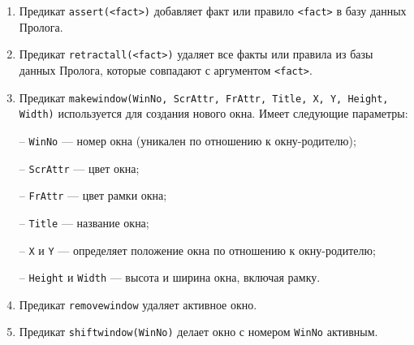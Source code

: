 \begin{enumerate}
\item Предикат \texttt{assert(<fact>)} добавляет факт или правило \texttt{<fact>} в базу данных Пролога.
\item Предикат \texttt{retractall(<fact>)} удаляет все факты или правила из базы данных Пролога, которые совпадают с аргументом \texttt{<fact>}.
\item Предикат \texttt{makewindow(WinNo, ScrAttr, FrAttr, Title, X, Y, Height, Width)}
  используется для создания нового окна. Имеет следующие параметры: \par
    -- \texttt{WinNo} --- номер окна (уникален по отношению к окну-родителю); \par
    -- \texttt{ScrAttr} --- цвет окна; \par
    -- \texttt{FrAttr} --- цвет рамки окна; \par 
    -- \texttt{Title} --- название окна; \par
    -- \texttt{X} и \texttt{Y} --- определяет положение окна по отношению к окну-родителю; \par 
    -- \texttt{Height} и \texttt{Width} --- высота и ширина окна, включая рамку.
\item Предикат \texttt{removewindow} удаляет активное окно.
\item Предикат \texttt{shiftwindow(WinNo)} делает окно с номером \texttt{WinNo} активным.
\end{enumerate}

\newpage